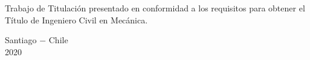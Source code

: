 {\vspace{0.5\baselineskip}

\begin{flushright}
\begin{minipage}{7cm}
\small{Trabajo de Titulación presentado en conformidad a los requisitos para obtener el Título de Ingeniero Civil en Mecánica.}
\end{minipage}
\end{flushright}

\vspace{3\baselineskip}

\begin{center}
\begin{minipage}[c]{15cm}
\centering
\small{Santiago $-$ Chile \\ 2020}
\end{minipage}
\end{center}

\restoregeometry
}

